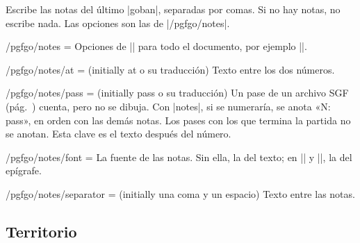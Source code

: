 	\begin{command}{\pgfgomovenotes{}}
		Escribe las notas del último |goban|, separadas por comas. Si no hay notas, no escribe nada. Las opciones son las de |/pgfgo/notes|.
	\end{command}

	\begin{key}{/pgfgo/notes = }
		Opciones de |\pgfgomovenotes| para todo el documento, por ejemplo ||.
	\end{key}

	\begin{key}{/pgfgo/notes/at =  (initially at o su traducción)}
		Texto entre los dos números.
	\end{key}

	\begin{key}{/pgfgo/notes/pass =  (initially pass o su traducción)}
		Un pase de un archivo SGF (pág.~\pageref{subsec:sgf}) cuenta, pero no se dibuja. Con |notes|, si se numeraría, se anota «N: pass», en orden con las demás notas. Los pases con los que termina la partida no se anotan. Esta clave es el texto después del número.
	\end{key}

	\begin{key}{/pgfgo/notes/font = }
		La fuente de las notas. Sin ella, la del texto; en |\sgfdiagrams| y |\sgfproblem|, la del epígrafe.
	\end{key}

	\begin{key}{/pgfgo/notes/separator =  (initially una coma y un espacio)}
		Texto entre las notas.

		\begin{codeexample}[]
			\begin{goban}[5, partial = A2:E4, notes]
			\end{goban}

			\pgfgomovenotes[at = en, separator = {; }]
		\end{codeexample}
	\end{key}

	\subsection{Territorio}
	\label{subsec:territorio}


